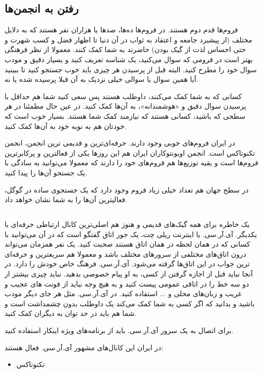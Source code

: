\subsection*{رفتن به انجمن‌ها}
فروم‌ها قدم دوم هستند. در فروم‌ها ده‌ها، صدها یا هزاران نفر هستند که به دلایل مختلف (از پیشبرد جامعه و اعتقاد به ثواب در آن دنیا تا اظهار فضل و کسب شهرت و حتی احساس لذت از گیک بودن) حاضرند به شما کمک کنند. معمولا از نظر فرهنگی بهتر است در فرومی که سوال می‌کنید، یک شناسه تعریف کنید و بسیار دقیق و مودب سوال خود را مطرح کنید. البته قبل از پرسیدن هر چیزی باید خوب جستجو کنید تا ببینید آیا همین سوال یا سوالی خیلی نزدیک به آن قبلا پرسیده شده یا نه.

کسانی که به شما کمک می‌کنند، داوطلب هستند پس سعی کنید شما هم حداقل با پرسیدن سوال دقیق و «هوشمندانه»، به آن‌ها کمک کنید. در عین حال مطمئنا در هر سطحی که باشید، کسانی هستند که نیازمند کمک شما هستند. بسیار خوب است که خودتان هم به نوبه خود به آن‌ها کمک کنید.

در ایران فروم‌های خوبی وجود دارند. حرفه‌ای‌ترین و قدیمی ترین انجمن، انجمن تکنوتاکس است. انجمن‌ اوبونتوکاران ایران هم این روزها یکی از فعالترین و پرکابرترین فروم‌ها است و بقیه توزیع‌ها هم فروم‌های خود را دارند که معمولا می‌توانید به سادگی با یک جستجو آن‌ها را پیدا کنید.

در سطح جهان هم تعداد خیلی زیاد فروم وجود دارد که یک جستجوی ساده در گوگل، فعالیترین آن‌ها را به شما نشان خواهد داد.
\subsection*{}
یک خاطره برای همه گیک‌های قدیمی و هنوز هم اصلی‌ترین کانال ارتباطی حرفه‌ای با یکدیگر. آی.آر.سی. یا اینترنت ریلی چت، یک جور اتاق گفتگو است که در آن می‌توانید با کسانی که در همان لحظه در همان اتاق هستند صحبت کنید. یک نفر همزمان می‌تواند درون اتاق‌های مختلفی از سرورهای مختلف باشد و معمولا هم سریعترین و حرفه‌ای ترین جواب در این اتاق‌ها گرفته می‌شود.
آی.آر.سی. فرهنگ خاص خودش را دارد. در آنجا نباید قبل از اجازه گرفتن از کسی، به او پیام خصوصی بدهید. نباید چیزی بیشتر از دو سه خط را در اتاقی عمومی پیست کنید و به هیچ وجه نباید از فونت های عجیب و غریب و زبان‌های محلی و ... استفاده کنید. در آی.آر.سی. مثل هر جای دیگر مودب باشید و بدانید که اگر کسی به شما کمک می‌کند یک داوطلب بدون چشمداشت است و شما هم باید در حد توان به دیگران کمک کنید.

برای اتصال به یک سرور آی.آر.سی. باید از برنامه‌های ویژه اینکار استفاده کنید.

در ایران این کانال‌های مشهور آی.آر.سی. فعال هستند:
\begin{itemize}
\item تکنوتاکس
\end{itemize}
